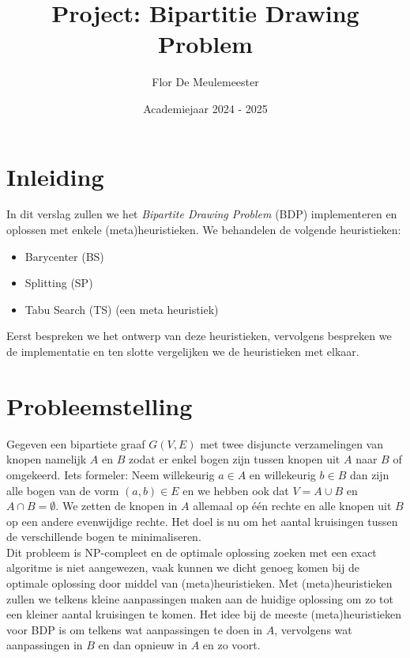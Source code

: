 \documentclass[kulak]{kulakarticle} %
\title{Project: Bipartitie Drawing Problem}
\author{Flor De Meulemeester}
\date{Academiejaar 2024 - 2025}
\begin{document}
\maketitle

\tableofcontents

\section*{Inleiding}

In dit verslag zullen we het \textit{Bipartite Drawing Problem} (BDP) implementeren en oplossen met enkele (meta)heuristieken. We behandelen de volgende heuristieken: 
\begin{itemize}
    \item Barycenter (BS)
    \item Splitting (SP)
    \item Tabu Search (TS) (een meta heuristiek)
\end{itemize}
Eerst bespreken we het ontwerp van deze heuristieken, vervolgens bespreken we de implementatie en ten slotte vergelijken we de heuristieken met elkaar.

\clearpage

\section{Probleemstelling} \label{chapter:probleemstelling}

Gegeven een bipartiete graaf $G(V,E)$ met twee disjuncte verzamelingen van knopen namelijk $A$ en $B$ zodat er enkel bogen zijn tussen knopen uit $A$ naar $B$ of omgekeerd. Iets formeler: Neem willekeurig $a \in A$ en willekeurig $b \in B$ dan zijn alle bogen van de vorm $(a,b) \in E$ en we hebben ook dat $V = A \cup B$ en $A \cap B = \emptyset$. We zetten de knopen in $A$ allemaal op één rechte en alle knopen uit $B$ op een andere evenwijdige rechte. Het doel is nu om het aantal kruisingen tussen de verschillende bogen te minimaliseren. \\

\noindent Dit probleem is NP-compleet en de optimale oplossing zoeken met een exact algoritme is niet aangewezen, vaak kunnen we dicht genoeg komen bij de optimale oplossing door middel van (meta)heuristieken. Met (meta)heuristieken zullen we telkens kleine aanpassingen maken aan de huidige oplossing om zo tot een kleiner aantal kruisingen te komen. Het idee bij de meeste (meta)heuristieken voor BDP is om telkens wat aanpassingen te doen in $A$, vervolgens wat aanpassingen in $B$ en dan opnieuw in $A$ en zo voort. \\
\end{document}
